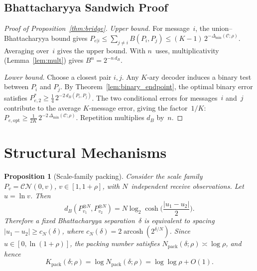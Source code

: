 \documentclass[lettersize,onecolumn]{IEEEtran}
\newtheorem{proposition}{Proposition}
\newcommand{\snr}{\rho}
\newcommand{\setC}{\mathcal{C}}
\begin{document}
\subsection{Bhattacharyya Sandwich Proof}

\begin{proof}[Proof of Proposition~\ref{thm:bridge}]
\emph{Upper bound.}
For message~$i$, the union--Bhattacharyya bound gives
$P_{e|i} \le \sum_{j\ne i} B(P_i,P_j) \le
(K-1)\,2^{-\Delta_{\min}(\setC;\snr)}$.
Averaging over~$i$ gives the upper bound. With $n$~uses,
multiplicativity (Lemma~\ref{lem:mult}) gives
$B^n = 2^{-n\,d_B}$.

\emph{Lower bound.}
Choose a closest pair $i,j$. Any $K$-ary decoder induces a binary
test between $P_i$ and $P_j$. By Theorem~\ref{lem:binary_endpoint},
the optimal binary error satisfies
$P_{e,2}^* \ge \tfrac{1}{4}\,2^{-2\,d_B(P_i,P_j)}$.
The two conditional errors for messages~$i$ and~$j$ contribute to the
average $K$-message error, giving the factor~$1/K$:
$P_{e,\mathrm{opt}} \ge \tfrac{1}{2K}\,2^{-2\,\Delta_{\min}(\setC;\snr)}$.
Repetition multiplies $d_B$ by~$n$.
\end{proof}

\section{Structural Mechanisms}\label{app:mechanisms}

\begin{proposition}[Scale-family packing]\label{prop:scale_family}
Consider the scale family
$P_v = \mathcal{CN}(0,v)$, $v \in [1,1+\snr]$,
with $N$~independent receive observations. Let $u = \ln v$. Then
\begin{equation}\label{eq:scale_bhatt_app}
d_B(P_{v_1}^{\otimes N}, P_{v_2}^{\otimes N})
= N\log_2\cosh\!\Big(\frac{|u_1-u_2|}{2}\Big).
\end{equation}
Therefore a fixed Bhattacharyya separation~$\delta$ is equivalent
to spacing
$|u_1-u_2| \ge c_N(\delta)$, where
$c_N(\delta) = 2\operatorname{arcosh}(2^{\delta/N})$.
Since $u \in [0,\ln(1+\snr)]$, the packing number satisfies
$N_{\mathrm{pack}}(\delta;\snr) \asymp \log\snr$, and hence
\begin{equation}\label{eq:kpack_loglog}
K_{\mathrm{pack}}(\delta;\snr) = \log N_{\mathrm{pack}}(\delta;\snr)
= \log\log\snr + O(1).
\end{equation}
\end{proposition}
\end{document}

